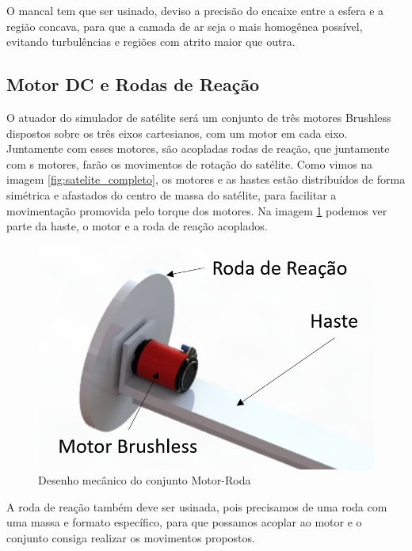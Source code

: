 O mancal tem que ser usinado, deviso a precisão do encaixe entre a esfera e a região concava, para que a camada de ar seja o mais homogênea possível, evitando turbulências e regiões com atrito maior que outra. 

\subsection{Motor DC e Rodas de Reação}

O atuador do simulador de satélite será um conjunto de três motores Brushless dispostos sobre os três eixos cartesianos, com um motor em cada eixo. Juntamente com esses motores, são acopladas rodas de reação, que juntamente com s motores, farão os movimentos de rotação do satélite. Como vimos na imagem \ref{fig:satelite_completo}, os motores e as hastes estão distribuídos de forma simétrica e afastados do centro de massa do satélite, para facilitar a movimentação promovida pelo torque dos motores. Na imagem \ref{fig:motor_roda_desenho} podemos ver parte da haste, o motor e a roda de reação acoplados.

\begin{figure}[H]
  \caption{Desenho mecânico do conjunto Motor-Roda}
  \begin{center}
      \includegraphics[scale=.45]{img/motor_roda_desenho}
  \end{center}
  \label{fig:motor_roda_desenho}
\end{figure}

A roda de reação também deve ser usinada, pois precisamos de uma roda com uma massa e formato específico, para que possamos acoplar ao motor e o conjunto consiga realizar os movimentos propostos. 

